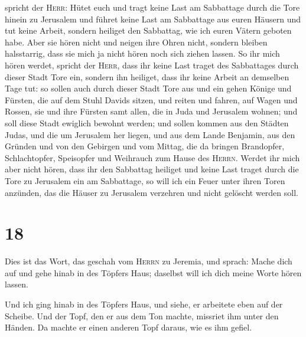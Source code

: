 spricht der \textsc{Herr}: Hütet euch und tragt keine Last am Sabbattage
durch die Tore hinein zu Jerusalem  und führet keine Last
am Sabbattage aus euren Häusern und tut keine Arbeit, sondern heiliget
den Sabbattag, wie ich euren Vätern geboten habe.  Aber
sie hören nicht und neigen ihre Ohren nicht, sondern bleiben
halsstarrig, dass sie mich ja nicht hören noch sich ziehen lassen.
 So ihr mich hören werdet, spricht der \textsc{Herr},
dass ihr keine Last traget des Sabbattages durch dieser Stadt Tore ein,
sondern ihn heiliget, dass ihr keine Arbeit an demselben Tage tut:
 so sollen auch durch dieser Stadt Tore aus und ein gehen
Könige und Fürsten, die auf dem Stuhl Davids sitzen, und reiten und
fahren, auf Wagen und Rossen, sie und ihre Fürsten samt allen, die in
Juda und Jerusalem wohnen; und soll diese Stadt ewiglich bewohnt werden;
 und sollen kommen aus den Städten Judas, und die um
Jerusalem her liegen, und aus dem Lande Benjamin, aus den Gründen und
von den Gebirgen und vom Mittag, die da bringen Brandopfer,
Schlachtopfer, Speisopfer und Weihrauch zum Hause des \textsc{Herrn}.
 Werdet ihr mich aber nicht hören, dass ihr den Sabbattag
heiliget und keine Last traget durch die Tore zu Jerusalem ein am
Sabbattage, so will ich ein Feuer unter ihren Toren anzünden, das die
Häuser zu Jerusalem verzehren und nicht gelöscht werden soll.

\hypertarget{section-17}{%
\section{18}\label{section-17}}

 Dies ist das Wort, das geschah vom \textsc{Herrn} zu
Jeremia, und sprach:  Mache dich auf und gehe hinab in des
Töpfers Haus; daselbst will ich dich meine Worte hören lassen.

 Und ich ging hinab in des Töpfers Haus, und siehe, er
arbeitete eben auf der Scheibe.  Und der Topf, den er aus
dem Ton machte, missriet ihm unter den Händen. Da machte er einen
anderen Topf daraus, wie es ihm gefiel.

